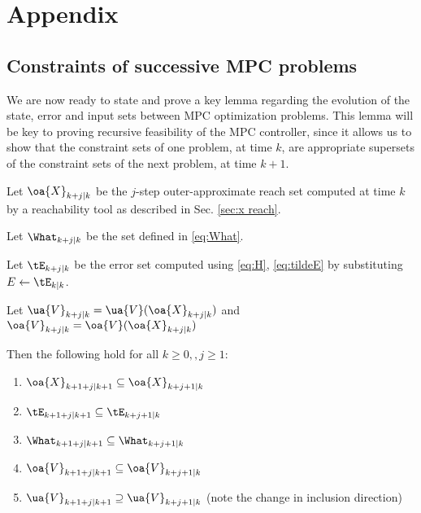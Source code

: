 \section*{Appendix}

\subsection{Constraints of successive MPC problems}
\label{sec:inclusions statement}
We are now ready to state and prove a key lemma regarding the evolution of the state, error and input sets between MPC optimization problems. 
This lemma will be key to proving recursive feasibility of the MPC controller, since it allows us to show that the constraint sets of one problem, at time $k$, are appropriate supersets of the constraint sets of the next problem, at time $k+1$. 

\begin{lemma}
	\label{lem:set inclusions}
	Let $\oa{X}_{k+j|k}$ be the $j$-step outer-approximate reach set computed at time $k$ by a reachability tool as described in Sec. \ref{sec:x reach}.
	
	Let $\What_{k+j|k}$ be the set defined in \eqref{eq:What}.
	
	Let $\tE_{k+j|k}$ be the error set computed using \eqref{eq:H}, \eqref{eq:tildeE} by substituting $E \leftarrow \tE_{k|k}$.
	
	Let $\ua{V}_{k+j|k} = \ua{V}(\oa{X}_{k+j|k})$ and $\oa{V}_{k+j|k} = \oa{V}(\oa{X}_{k+j|k})$ 

Then the following hold for all $k \geq 0, ,j \geq 1$:
\begin{enumerate}
	\item $\oa{X}_{k+1+j|k+1} \subseteq \oa{X}_{k+j+1|k}$
	\label{set:X}
	\item $\tE_{k+1+j|k+1} \subseteq \tE_{k+j+1|k}$
	\label{set:tE}
	\item $\What_{k+1+j|k+1} \subseteq \What_{k+j+1|k}$
	\label{set:What}
	\item $\oa{V}_{k+1+j|k+1} \subseteq \oa{V}_{k+j+1|k}$
	\label{set:oaV}
	\item $\ua{V}_{k+1+j|k+1} \supseteq \ua{V}_{k+j+1|k}$ (note the change in inclusion direction)
	\label{set:uaV}		
\end{enumerate} 
\end{lemma} 

